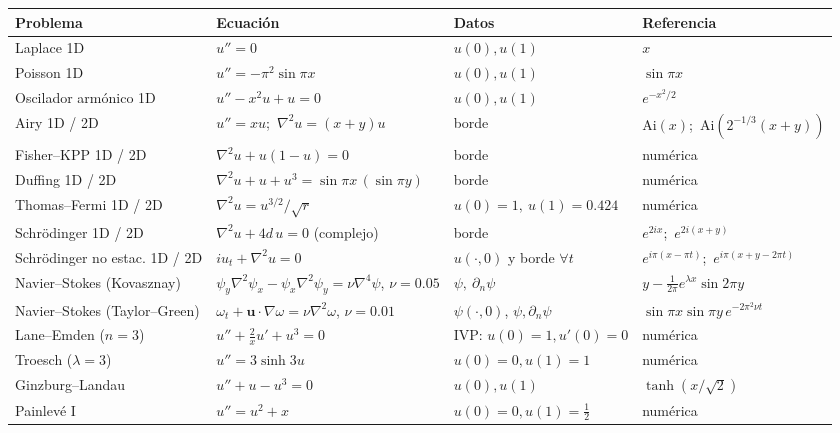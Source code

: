 \documentclass[11pt,a4paper]{article}
\begin{document}
{\small
\begin{longtable}{@{}p{3.1cm}p{5.0cm}p{2.9cm}p{3.3cm}@{}}
\toprule
\textbf{Problema} & \textbf{Ecuación} & \textbf{Datos} & \textbf{Referencia}\\\midrule\endhead
Laplace 1D & $u''=0$ & $u(0),u(1)$ & $x$\\
Poisson 1D & $u''=-\pi^2\sin\pi x$ & $u(0),u(1)$ & $\sin\pi x$\\
Oscilador armónico 1D & $u''-x^2u+u=0$ & $u(0),u(1)$ & $e^{-x^2/2}$\\
Airy 1D / 2D & $u''=xu$;\ $\nabla^2u=(x+y)u$ & borde & $\mathrm{Ai}(x)$;\ $\mathrm{Ai}(2^{-1/3}(x+y))$\\
Fisher--KPP 1D / 2D & $\nabla^2u+u(1-u)=0$ & borde & numérica\\
Duffing 1D / 2D & $\nabla^2u+u+u^3=\sin\pi x\,(\sin\pi y)$ & borde & numérica\\
Thomas--Fermi 1D / 2D & $\nabla^2u=u^{3/2}/\sqrt r$ & $u(0)=1,\ u(1)=0.424$ & numérica\\
Schrödinger 1D / 2D & $\nabla^2u+4d\,u=0$ (complejo) & borde & $e^{2ix}$;\ $e^{2i(x+y)}$\\
Schrödinger no estac. 1D / 2D & $i u_t+\nabla^2u=0$ & $u(\cdot,0)$ y borde $\forall t$ & $e^{i\pi(x-\pi t)}$;\ $e^{i\pi(x+y-2\pi t)}$\\
Navier--Stokes (Kovasznay) & $\psi_y\nabla^2\psi_x-\psi_x\nabla^2\psi_y=\nu\nabla^4\psi$, $\nu=0.05$ & $\psi,\ \partial_n\psi$ & $y-\tfrac{1}{2\pi}e^{\lambda x}\sin 2\pi y$\\
Navier--Stokes (Taylor--Green) & $\omega_t+\mathbf u\cdot\nabla\omega=\nu\nabla^2\omega$, $\nu=0.01$ & $\psi(\cdot,0)$, $\psi,\partial_n\psi$ & $\sin\pi x\sin\pi y\,e^{-2\pi^2\nu t}$\\
Lane--Emden ($n=3$) & $u''+\tfrac2x u'+u^3=0$ & IVP: $u(0)=1,u'(0)=0$ & numérica\\
Troesch ($\lambda=3$) & $u''=3\sinh 3u$ & $u(0)=0,u(1)=1$ & numérica\\
Ginzburg--Landau & $u''+u-u^3=0$ & $u(0),u(1)$ & $\tanh(x/\sqrt2)$\\
Painlevé I & $u''=u^2+x$ & $u(0)=0,u(1)=\tfrac12$ & numérica\\\bottomrule
\end{longtable}}
\end{document}
